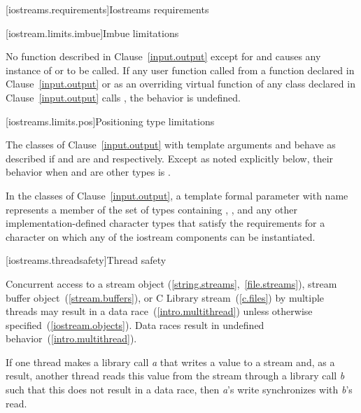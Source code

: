 [iostreams.requirements]{Iostreams requirements}

[iostream.limits.imbue]{Imbue limitations}

\pnum
No function described in Clause~\ref{input.output} except for
and 
causes any instance of
or
to be called.
If any user function called from a function declared in Clause~\ref{input.output} or
as an overriding virtual function of any class declared in Clause~\ref{input.output}
calls
,
the behavior is undefined.

[iostreams.limits.pos]{Positioning type limitations}

\pnum
The classes of Clause~\ref{input.output} with template arguments
and
behave as described if
and
are
and
respectively.
Except as noted explicitly below, their behavior when
and
are other types is
%
.

\pnum
In the classes of Clause~\ref{input.output}, a template formal parameter with name
 represents a member of the set of types containing , ,
and any other implementation-defined character types that satisfy the requirements for
a character on which any of the iostream components can be instantiated.

[iostreams.threadsafety]{Thread safety}

\pnum
Concurrent access to a stream object (\ref{string.streams},~\ref{file.streams}), stream buffer
object~(\ref{stream.buffers}), or C Library stream~(\ref{c.files}) by multiple threads may result in
a data race~(\ref{intro.multithread}) unless otherwise specified~(\ref{iostream.objects}).
\enternote Data races result in undefined behavior~(\ref{intro.multithread}). \exitnote

\pnum
If one thread makes a library call \textit{a} that writes a value to a stream
and, as a result, another thread reads this value from the stream through a
library call \textit{b} such that this does not result in a data race, then
\textit{a}'s write synchronizes with
\textit{b}'s read.

